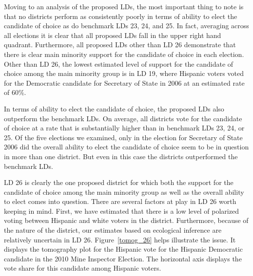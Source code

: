 \documentclass[12pt]{article}
\begin{document}
Moving to an analysis of the proposed LDs, the most important thing to note is that no districts perform as consistently poorly in terms of ability to elect the candidate of choice as do benchmark LDs 23, 24, and 25. In fact, averaging across all elections it is clear that all proposed LDs fall in the upper right hand quadrant. Furthermore, all proposed LDs other than LD 26 demonstrate that there is clear main minority support for the candidate of choice in each election. Other than LD 26, the lowest estimated level of support for the candidate of choice among the main minority group is in LD 19, where Hispanic voters voted for the Democratic candidate for Secretary of State in 2006 at an estimated rate of 60\%. 

In terms of ability to elect the candidate of choice, the proposed LDs also outperform the benchmark LDs. On average, all districts vote for the candidate of choice at a rate that is substantially higher than in benchmark LDs 23, 24, or 25. Of the five elections we examined, only in the election for Secretary of State 2006 did the overall ability to elect the candidate of choice seem to be in question in more than one district. But even in this case the districts outperformed the benchmark LDs.

LD 26 is clearly the one proposed district for which both the support for the candidate of choice among the main minority group as well as the overall ability to elect comes into question. There are several factors at play in LD 26 worth keeping in mind. First, we have estimated that there is a low level of polarized voting between Hispanic and white voters in the district. Furthermore, because of the nature of the district, our estimates based on ecological inference are relatively uncertain in LD 26. Figure~\ref{tomog_26} helps illustrate the issue. It displays the tomography plot for the Hispanic vote for the Hispanic Democratic candidate in the 2010 Mine Inspector Election. The horizontal axis displays the vote share for this candidate among Hispanic voters. 
\end{document}

